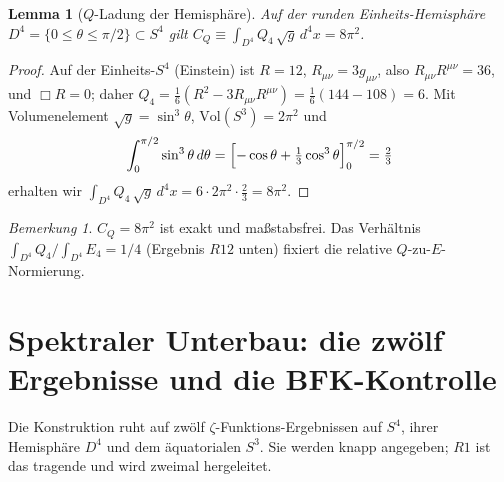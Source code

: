 \documentclass[11pt,a4paper]{article}
\newtheorem{lemma}{Lemma}
\theoremstyle{definition}
\theoremstyle{remark}
\newtheorem{remark}{Bemerkung}
\newcommand{\CQ}{C_Q}
\begin{document}
\begin{lemma}[$Q$-Ladung der Hemisphäre]\label{lem:qcharge}
Auf der runden Einheits-Hemisphäre $D^4=\{0\le\theta\le\pi/2\}\subset S^4$ gilt
$\displaystyle\CQ\equiv\int_{D^4}Q_4\,\sqrt g\,d^4x=8\pi^2$.
\end{lemma}
\begin{proof}
Auf der Einheits-$S^4$ (Einstein) ist $R=12$, $R_{\mu\nu}=3g_{\mu\nu}$, also
$R_{\mu\nu}R^{\mu\nu}=36$, und $\Box R=0$; daher
$Q_4=\tfrac16(R^2-3R_{\mu\nu}R^{\mu\nu})=\tfrac16(144-108)=6$. Mit Volumenelement
$\sqrt g=\sin^3\theta$, $\mathrm{Vol}(S^3)=2\pi^2$ und
\[
\int_0^{\pi/2}\sin^3\theta\,d\theta=\Bigl[-\cos\theta+\tfrac13\cos^3\theta\Bigr]_0^{\pi/2}=\tfrac23
\]
erhalten wir $\int_{D^4}Q_4\,\sqrt g\,d^4x=6\cdot 2\pi^2\cdot\tfrac23=8\pi^2.$
\end{proof}
\begin{remark}
$\CQ=8\pi^2$ ist exakt und maßstabsfrei. Das Verhältnis $\int_{D^4}Q_4/\int_{D^4}E_4=1/4$
(Ergebnis $R12$ unten) fixiert die relative $Q$-zu-$E$-Normierung.
\end{remark}

\section{Spektraler Unterbau: die zwölf Ergebnisse und die BFK-Kontrolle}\label{sec:spectral}
Die Konstruktion ruht auf zwölf $\zeta$-Funktions-Ergebnissen auf $S^4$, ihrer Hemisphäre $D^4$ und
dem äquatorialen $S^3$. Sie werden knapp angegeben; $R1$ ist das tragende und wird zweimal
hergeleitet.
\end{document}
